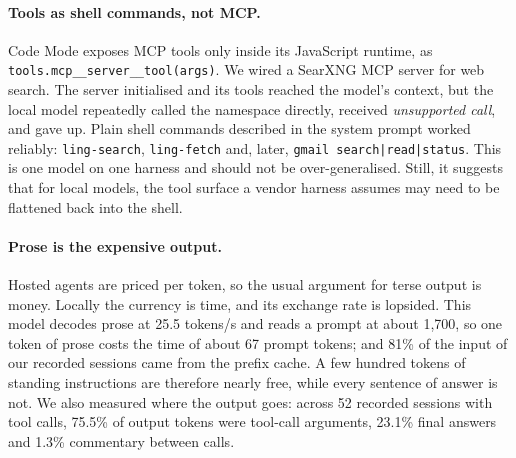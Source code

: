 \documentclass[11pt]{article}
\newcommand{\code}[1]{\texttt{#1}}
\begin{document}
\paragraph{Tools as shell commands, not MCP.} Code Mode exposes MCP tools only inside its JavaScript
runtime, as \code{tools.mcp\_\_server\_\_tool(args)}. We wired a SearXNG \cite{searxng} MCP server
for web search. The server initialised and its tools reached the model's context, but the local
model repeatedly called the namespace directly, received \emph{unsupported call}, and gave up.
Plain shell commands described in the system prompt worked reliably:
\code{ling-search}, \code{ling-fetch} and, later, \code{gmail search|read|status}. This is one
model on one harness and should not be over-generalised. Still, it suggests that for local models,
the tool surface a vendor harness assumes may need to be flattened back into the shell.

\paragraph{Prose is the expensive output.} Hosted agents are priced per token, so the usual argument
for terse output is money. Locally the currency is time, and its exchange rate is lopsided. This
model decodes prose at 25.5 tokens/s and reads a prompt at about 1{,}700, so one token of prose
costs the time of about 67 prompt tokens; and 81\% of the input of our recorded sessions came from
the prefix cache. A few hundred tokens of standing instructions are therefore nearly free, while
every sentence of answer is not. We also measured where the output goes: across 52 recorded
sessions with tool calls, 75.5\% of output tokens were tool-call arguments, 23.1\% final answers
and 1.3\% commentary between calls.
\end{document}
